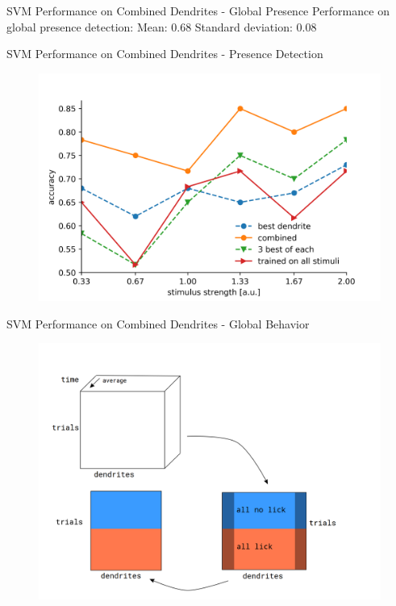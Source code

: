 \documentclass[10pt]{beamer}
\begin{document}
\begin{frame}[fragile]{SVM Performance on Combined Dendrites - Global Presence}
Performance on global presence detection: \newline
Mean: 0.68 \newline
Standard deviation: 0.08
\end{frame}

\begin{frame}[fragile]{SVM Performance on Combined Dendrites - Presence Detection}
\begin{center}
	\begin{figure}
      \includegraphics[width=1.0\textwidth]{combined_presence_alt.png}
	\end{figure}
	\end{center}
\end{frame}

\begin{frame}[fragile]{SVM Performance on Combined Dendrites - Global Behavior}
\begin{center}
	\begin{figure}
      \includegraphics[width=1.0\textwidth]{data_hm_tot.png}
	\end{figure}
	\end{center}
\end{frame}
\end{document}
